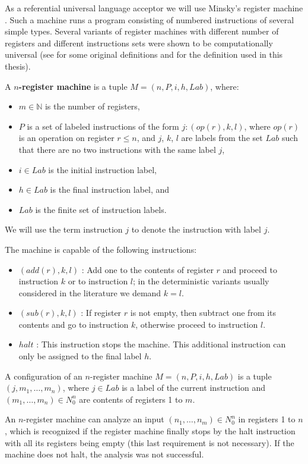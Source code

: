 As a referential universal language acceptor we will use  Minsky's register machine \cite{Ionescu:jucs_10_5:on_p_systems_with}. Such a machine runs a program consisting of numbered instructions of several simple types. Several variants of register machines with different number of registers and different instructions sets were shown to be computationally universal (see \cite{Ibarra05Active} for some original definitions and \cite{Khrisna03threeuniversality} for the definition used in this thesis).
\begin{definition}
  A {\bf $n$-register machine} is a tuple $M = (n,P,i,h,Lab)$, where:
  \begin{itemize}
    \item $m\in\mathbb N$ is the number of registers,
    \item $P$ is a set of labeled instructions of the form $j : (op(r),k,l)$, where $op(r)$ is an operation on register $r\leq n$, and $j$, $k$, $l$ are labels from the set $Lab$ such that there are no two instructions with the same label $j$,
    \item $i\in Lab$ is the initial instruction label,
    \item $h\in Lab$ is the final instruction label, and
    \item $Lab$ is the finite set of instruction labels.
  \end{itemize}
\end{definition}

We will use the term instruction $j$ to denote the instruction with label $j$.

The machine is capable of the following instructions:
\begin{itemize}
  \item $(add(r),k,l)$ : Add one to the contents of register $r$ and proceed to instruction $k$ or to instruction $l$; in the deterministic variants usually considered in the literature we demand $k = l$.
  \item $(sub(r),k,l)$ : If register $r$ is not empty, then subtract one from its contents and go to instruction $k$, otherwise proceed to instruction $l$.
  \item $halt$ : This instruction stops the machine. This additional instruction can only be assigned to the final label $h$.
\end{itemize}

\begin{definition}
  A configuration of an $n$-register machine $M = (n,P,i,h,Lab)$ is a tuple $(j, m_1, \dots , m_n)$, where $j\in Lab$ is a label of the current instruction and $(m_1,\dots,m_n)\in N_0^n$ are contents of registers 1 to $m$.
\end{definition}

An $n$-register machine can analyze an input $(n_1,\dots,n_m)\in N_0^n$ in registers 1 to $n$, which is recognized if the register machine finally stops by the halt instruction with all its registers being empty (this last requirement is not necessary). If the machine does not halt, the analysis was not successful.